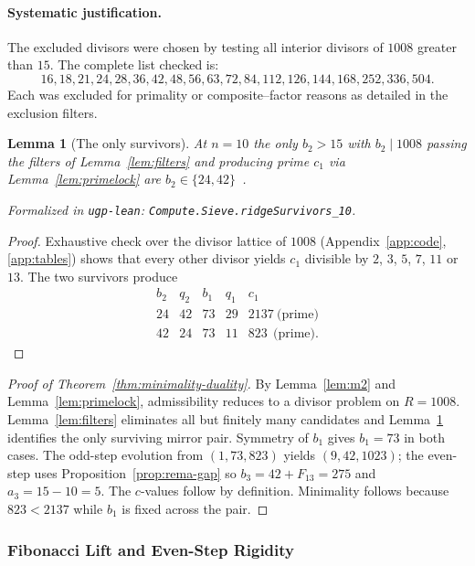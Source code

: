 \documentclass[12pt]{article}
\newtheorem{lemma}[theorem]{Lemma}
\numberwithin{equation}{section}
\begin{document}
\paragraph{Systematic justification.}
The excluded divisors were chosen by testing all interior divisors of $1008$
greater than $15$. The complete list checked is:
\[
16, 18, 21, 24, 28, 36, 42, 48, 56, 63, 72, 84, 112, 126, 144, 168, 252, 336, 504.
\]
Each was excluded for primality or composite–factor reasons as detailed in the
exclusion filters.

\begin{lemma}[The only survivors]\label{lem:survivors}
At $n=10$ the only $b_2>15$ with $b_2\mid 1008$ passing the filters of Lemma~\ref{lem:filters} and producing prime $c_1$ via Lemma~\ref{lem:primelock} are $b_2\in\{24,42\}$~\cite{SpivackUGPFormalization,ugp-lean}.

\noindent\emph{Formalized in} \texttt{ugp-lean}: \texttt{Compute.Sieve.ridgeSurvivors\_10}.
\end{lemma}
\begin{proof}
Exhaustive check over the divisor lattice of $1008$ (Appendix~\ref{app:code}, \ref{app:tables}) shows that every other divisor yields $c_1$ divisible by $2$, $3$, $5$, $7$, $11$ or $13$. The two survivors produce
\[
\begin{array}{c|cccc}
b_2 & q_2 & b_1 & q_1 & c_1\\\hline
24  & 42  & 73  & 29 & 2137\ \text{(prime)}\\
42  & 24  & 73  & 11 & 823\ \ \text{(prime)}.
\end{array}
\]
\end{proof}

\begin{proof}[Proof of Theorem~\ref{thm:minimality-duality}]
By Lemma~\ref{lem:m2} and Lemma~\ref{lem:primelock}, admissibility reduces to a divisor problem on $R=1008$. Lemma~\ref{lem:filters} eliminates all but finitely many candidates and Lemma~\ref{lem:survivors} identifies the only surviving mirror pair. Symmetry of $b_1$ gives $b_1=73$ in both cases. The odd-step evolution from $(1,73,823)$ yields $(9,42,1023)$; the even-step uses Proposition~\ref{prop:rema-gap} so $b_3=42+F_{13}=275$ and $a_3=15-10=5$. The $c$-values follow by definition. Minimality follows because $823<2137$ while $b_1$ is fixed across the pair.
\end{proof}


\subsubsection{Fibonacci Lift and Even-Step Rigidity}
\end{document}
